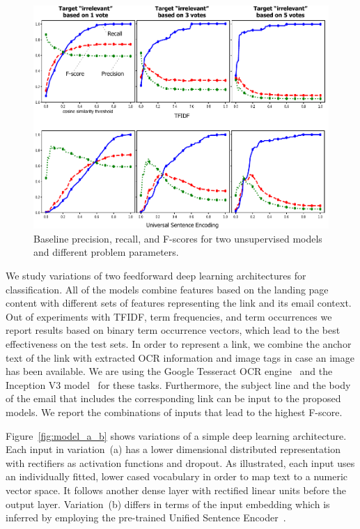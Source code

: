 \documentclass{sigchi}
\begin{document}
\begin{figure}[bt]
	\centering
	\includegraphics[width=1.0\columnwidth]{figures/cos_sim_link_text_email_subject_email_text_votes_1_3_5.pdf}
	\caption{Baseline precision, recall, and F-scores for two unsupervised models and different problem parameters.}
	\label{fig:model_baseline}
\end{figure}

We study variations of two feedforward deep learning architectures for classification. All of the models combine features based on the landing page content with different sets of features representing the link and its email context. Out of experiments with TFIDF, term frequencies, and term occurrences we report results based on binary term occurrence vectors, which lead to the best effectiveness on the test sets. In order to represent a link, we combine the anchor text of the link with extracted OCR information and image tags in case an image has been available. We are using the Google Tesseract OCR engine~\cite{smith_2007} and the Inception V3 model~\cite{szegedy_2015} for these tasks. Furthermore, the subject line and the body of the email that includes the corresponding link can be input to the proposed models. We report the combinations of inputs that lead to the highest F-score. 

Figure~\ref{fig:model_a_b} shows variations of a simple deep learning architecture. Each input in variation~(a) has a lower dimensional distributed representation with rectifiers as activation functions and dropout. As illustrated, each input uses an individually fitted, lower cased vocabulary in order to map text to a numeric vector space. It follows another dense layer with rectified linear units before the output layer. Variation~(b) differs in terms of the input embedding which is inferred by employing the pre-trained Unified Sentence Encoder~\cite{cer_2018}.
\end{document}
